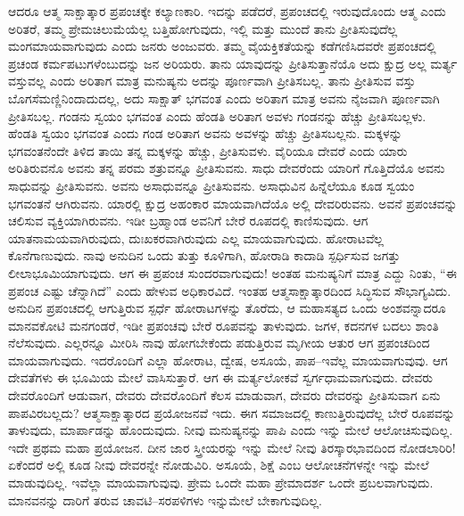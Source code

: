 ಆದರೂ ಆತ್ಮ ಸಾಕ್ಷಾತ್ಕಾರ ಪ್ರಪಂಚಕ್ಕೇ ಕಲ್ಯಾಣಕಾರಿ. ಇದನ್ನು ಪಡೆದರೆ, ಪ್ರಪಂಚದಲ್ಲಿ ಇರುವುದೊಂದು ಆತ್ಮ ಎಂದು ಅರಿತರೆ, ತಮ್ಮ ಪ್ರೇಮಚಿಲುಮೆಯೆಲ್ಲ ಬತ್ತಿಹೋಗುವುದು, ಇಲ್ಲಿ ಮತ್ತು ಮುಂದೆ ತಾನು ಪ್ರೀತಿಸುವುದೆಲ್ಲ ಮಂಗಮಾಯವಾಗುವುದು ಎಂದು ಜನರು ಅಂಜುವರು. ತಮ್ಮ ವೈಯಕ್ತಿಕತೆಯನ್ನು ಕಡೆಗಣಿಸಿದವರೇ ಪ್ರಪಂಚದಲ್ಲಿ ಪ್ರಚಂಡ ಕರ್ಮಪಟುಗಳೆಂಬುದನ್ನು ಜನ ಅರಿಯರು. ತಾನು ಯಾವುದನ್ನು ಪ್ರೀತಿಸುತ್ತಾನೆಯೊ ಅದು ಕ್ಷುದ್ರ ಅಲ್ಲ ಮರ್ತ್ಯ ವಸ್ತುವಲ್ಲ ಎಂದು ಅರಿತಾಗ ಮಾತ್ರ ಮನುಷ್ಯನು ಅದನ್ನು ಪೂರ್ಣವಾಗಿ ಪ್ರೀತಿಸಬಲ್ಲ. ತಾನು ಪ್ರೀತಿಸುವ ವಸ್ತು ಬೊಗಸೆಮಣ್ಣಿನಿಂದಾದುದಲ್ಲ, ಅದು ಸಾಕ್ಷಾತ್​ ಭಗವಂತ ಎಂದು ಅರಿತಾಗ ಮಾತ್ರ ಅವನು ನೈಜವಾಗಿ ಪೂರ್ಣವಾಗಿ ಪ್ರೀತಿಸಬಲ್ಲ. ಗಂಡನು ಸ್ವಯಂ ಭಗವಂತ ಎಂದು ಹೆಂಡತಿ ಅರಿತಾಗ ಅವಳು ಗಂಡನನ್ನು ಹೆಚ್ಚು ಪ್ರೀತಿಸಬಲ್ಲಳು. ಹೆಂಡತಿ ಸ್ವಯಂ ಭಗವಂತ ಎಂದು ಗಂಡ ಅರಿತಾಗ ಅವನು ಅವಳನ್ನು ಹೆಚ್ಚು ಪ್ರೀತಿಸಬಲ್ಲನು. ಮಕ್ಕಳನ್ನು ಭಗವಂತನೆಂದೇ ತಿಳಿದ ತಾಯಿ ತನ್ನ ಮಕ್ಕಳನ್ನು ಹೆಚ್ಚು, ಪ್ರೀತಿಸುವಳು. ವೈರಿಯೂ ದೇವರೆ ಎಂದು ಯಾರು ಅರಿತಿರುವನೊ ಅವನು ತನ್ನ ಪರಮ ಶತ್ರುವನ್ನೂ ಪ್ರೀತಿಸುವನು. ಸಾಧು ದೇವರೆಂದು ಯಾರಿಗೆ ಗೊತ್ತಿದೆಯೊ ಅವನು ಸಾಧುವನ್ನು ಪ್ರೀತಿಸುವನು. ಅವನು ಅಸಾಧುವನ್ನೂ ಪ್ರೀತಿಸುವನು. ಅಸಾಧುವಿನ ಹಿನ್ನೆಲೆಯೂ ಕೂಡ ಸ್ವಯಂ ಭಗವಂತನೆ ಆಗಿರುವನು. ಯಾರಲ್ಲಿ ಕ್ಷುದ್ರ ಅಹಂಕಾರ ಮಾಯವಾಗಿದೆಯೊ ಅಲ್ಲಿ ದೇವರಿರುವನು. ಅವನೆ ಪ್ರಪಂಚವನ್ನು ಚಲಿಸುವ ವ್ಯಕ್ತಿಯಾಗಿರುವನು. ಇಡೀ ಬ್ರಹ್ಮಾಂಡ ಅವನಿಗೆ ಬೇರೆ ರೂಪದಲ್ಲಿ ಕಾಣಿಸುವುದು. ಆಗ ಯಾತನಾಮಯವಾಗಿರುವುದು, ದುಃಖಕರವಾಗಿರುವುದು ಎಲ್ಲ ಮಾಯವಾಗುವುದು. ಹೋರಾಟವೆಲ್ಲ ಕೊನೆಗಾಣುವುದು. ನಾವು ಅನುದಿನ ಒಂದು ತುತ್ತು ಕೂಳಿಗಾಗಿ, ಹೋರಾಡಿ ಕಾದಾಡಿ ಸ್ಪರ್ಧಿಸುವ ಜಗತ್ತು ಲೀಲಾಭೂಮಿಯಾಗುವುದು. ಆಗ ಈ ಪ್ರಪಂಚ ಸುಂದರವಾಗುವುದು! ಅಂತಹ ಮನುಷ್ಯನಿಗೆ ಮಾತ್ರ ಎದ್ದು ನಿಂತು, “ಈ ಪ್ರಪಂಚ ಎಷ್ಟು ಚೆನ್ನಾಗಿದೆ” ಎಂದು ಹೇಳುವ ಅಧಿಕಾರವಿದೆ. ಇಂತಹ ಆತ್ಮಸಾಕ್ಷಾತ್ಕಾರದಿಂದ ಸಿದ್ಧಿಸುವ ಸೌಭಾಗ್ಯವಿದು. ಅನುದಿನ ಪ್ರಪಂಚದಲ್ಲಿ ಆಗುತ್ತಿರುವ ಸ್ಪರ್ಧೆ ಹೋರಾಟಗಳನ್ನು ತೊರೆದು, ಆ ಮಹಾಸತ್ಯದ ಒಂದು ಅಂಶವನ್ನಾದರೂ ಮಾನವಕೋಟಿ ಮನಗಂಡರೆ, ಇಡೀ ಪ್ರಪಂಚವು ಬೇರೆ ರೂಪವನ್ನು ತಾಳುವುದು. ಜಗಳ, ಕದನಗಳ ಬದಲು ಶಾಂತಿ ನೆಲೆಸುವುದು. ಎಲ್ಲರನ್ನೂ ಮೀರಿಸಿ ನಾವು ಹೋಗಬೇಕೆಂದು ಪಡುತ್ತಿರುವ ಮೃಗೀಯ ಆತುರ ಆಗ ಪ್ರಪಂಚದಿಂದ ಮಾಯವಾಗುವುದು. ಇದರೊಂದಿಗೆ ಎಲ್ಲಾ ಹೋರಾಟ, ದ್ವೇಷ, ಅಸೂಯೆ, ಪಾಪ–ಇವೆಲ್ಲ ಮಾಯವಾಗುವುವು. ಆಗ ದೇವತೆಗಳು ಈ ಭೂಮಿಯ ಮೇಲೆ ವಾಸಿಸುತ್ತಾರೆ. ಆಗ ಈ ಮರ್ತ್ಯಲೋಕವೆ ಸ್ವರ್ಗಧಾಮವಾಗುವುದು. ದೇವರು ದೇವರೊಂದಿಗೆ ಆಡುವಾಗ, ದೇವರು ದೇವರೊಂದಿಗೆ ಕೆಲಸ ಮಾಡುವಾಗ, ದೇವರು ದೇವರನ್ನು ಪ್ರೀತಿಸುವಾಗ ಏನು ಪಾಪವಿರಬಲ್ಲದು? ಆತ್ಮಸಾಕ್ಷಾತ್ಕಾರದ ಪ್ರಯೋಜನವೆ ಇದು. ಈಗ ಸಮಾಜದಲ್ಲಿ ಕಾಣುತ್ತಿರುವುದೆಲ್ಲ ಬೇರೆ ರೂಪವನ್ನು ತಾಳುವುದು, ಮಾರ್ಪಾಡನ್ನು ಹೊಂದುವುದು. ನೀವು ಮನುಷ್ಯನನ್ನು ಪಾಪಿ ಎಂದು ಇನ್ನು ಮೇಲೆ ಆಲೋಚಿಸುವುದಿಲ್ಲ. ಇದೇ ಪ್ರಥಮ ಮಹಾ ಪ್ರಯೋಜನ. ದೀನ ಜಾರ ಸ್ತ್ರೀಯರನ್ನು ಇನ್ನು ಮೇಲೆ ನೀವು ತಿರಸ್ಕಾರಭಾವದಿಂದ ನೋಡಲಾರಿರಿ! ಏಕೆಂದರೆ ಅಲ್ಲಿ ಕೂಡ ನೀವು ದೇವರನ್ನೇ ನೋಡುವಿರಿ. ಅಸೂಯೆ, ಶಿಕ್ಷೆ ಎಂಬ ಆಲೋಚನೆಗಳನ್ನೇ ಇನ್ನು ಮೇಲೆ ಮಾಡುವುದಿಲ್ಲ. ಇವೆಲ್ಲಾ ಮಾಯವಾಗುವುವು. ಪ್ರೇಮ ಒಂದೇ ಮಹಾ ಪ್ರೇಮಾದರ್ಶ ಒಂದೇ ಪ್ರಬಲವಾಗುವುದು. ಮಾನವನನ್ನು ದಾರಿಗೆ ತರುವ ಚಾವಟಿ–ಸರಪಳಿಗಳು ಇನ್ನುಮೇಲೆ ಬೇಕಾಗುವುದಿಲ್ಲ.

\vskip 0.2cm

